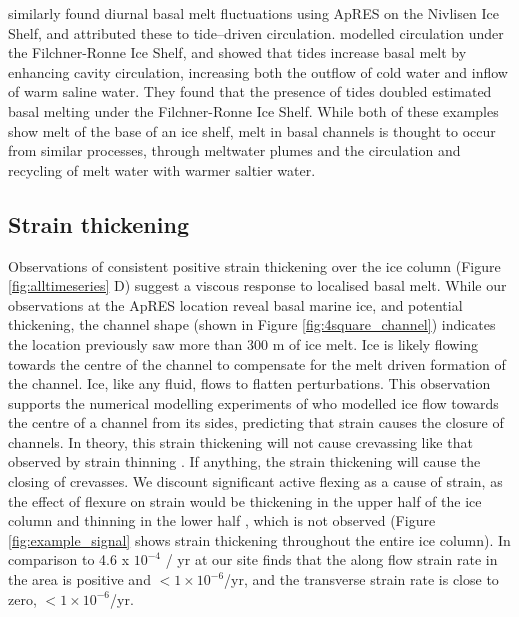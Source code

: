 \cite{lindback2019spatial} similarly found diurnal basal melt fluctuations using ApRES on the Nivlisen Ice Shelf, and attributed these to tide--driven circulation.
\cite{makinson2011influence} modelled circulation under the Filchner-Ronne Ice Shelf, and showed that tides increase basal melt by enhancing cavity circulation, increasing both the outflow of cold water and inflow of warm saline water. They found that the presence of tides doubled estimated basal melting under the Filchner-Ronne Ice Shelf. While both of these examples show melt of the base of an ice shelf, melt in basal channels is thought to occur from similar processes, through meltwater plumes \citep{sergienko2013basal} and the circulation and recycling of melt water with warmer saltier water.
 
 
  
\subsection{Strain thickening} 
 
Observations of consistent positive strain thickening over the ice column (Figure \ref{fig:alltimeseries} D) suggest a viscous response to localised basal melt.  While our observations at the ApRES location reveal basal marine ice, and potential thickening, the channel shape (shown in Figure \ref{fig:4square_channel}) indicates the location previously saw more than 300 m of ice  melt. Ice is likely flowing towards the centre of the channel to compensate for the melt driven formation of the channel. Ice, like any fluid, flows to flatten perturbations. This observation supports the numerical modelling experiments of \citep{wearing2021ice} who modelled ice flow towards the centre of a channel from its sides, predicting that strain causes the closure of channels. 
In theory, this strain thickening will not cause crevassing like that observed by strain thinning \citep[e.g.][]{vaughan2012subglacial}. If anything, the strain thickening will cause the closing of crevasses.
We discount significant active flexing as a cause of strain, as the effect of flexure on strain would be thickening in the upper half of the ice column and  thinning in the lower half \citep{vaughan2012subglacial}, which is not observed (Figure \ref{fig:example_signal} shows strain thickening throughout the entire ice column).
In comparison to 4.6 x $10^{-4}$ / yr at our site \cite{alley2018continent} finds that the along flow strain rate in the area is positive and $< 1 \times 10 ^{-6}$/yr, and the transverse strain rate is close to zero, $< 1 \times 10 ^{-6}$/yr.


